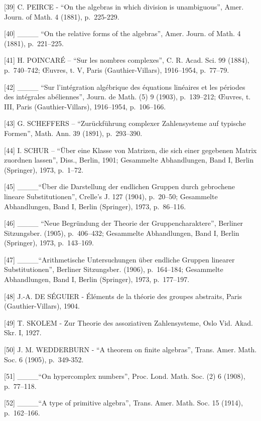 {[}39{]} C. PEIRCE - ``On the algebras in which division is unambiguous'', Amer. Journ. of Math. 4 (1881), p.~225-229.

{[}40{]} \_\_\_\_ ``On the relative forms of the algebras'', Amer. Journ. of Math. 4 (1881), p.~221--225.

{[}41{]} H. POINCARÉ -- ``Sur les nombres complexes'', C. R. Acad. Sci. 99 (1884), p.~740--742; Œuvres, t. V, Paris (Gauthier-Villars), 1916--1954, p.~77--79.

{[}42{]} \_\_\_\_ ``Sur l'intégration algébrique des équations linéaires et les périodes des intégrales abéliennes'', Journ. de Math. (5) 9 (1903), p.~139--212; Œuvres, t. III, Paris (Gauthier-Villars), 1916--1954, p.~106--166.

{[}43{]} G. SCHEFFERS -- ``Zurückführung complexer Zahlensysteme auf typische Formen'', Math. Ann. 39 (1891), p.~293--390.

{[}44{]} I. SCHUR -- ``Über eine Klasse von Matrizen, die sich einer gegebenen Matrix zuordnen lassen'', Diss., Berlin, 1901; Gesammelte Abhandlungen, Band I, Berlin (Springer), 1973, p.~1--72.

{[}45{]} \_\_\_\_``Über die Darstellung der endlichen Gruppen durch gebrochene lineare Substitutionen'', Crelle's J. 127 (1904), p.~20--50; Gesammelte Abhandlungen, Band I, Berlin (Springer), 1973, p.~86--116.

{[}46{]} \_\_\_\_ ``Neue Begründung der Theorie der Gruppencharaktere'', Berliner Sitzungsber. (1905), p.~406--432; Gesammelte Abhandlungen, Band I, Berlin (Springer), 1973, p.~143--169.

{[}47{]} \_\_\_\_``Arithmetische Untersuchungen über endliche Gruppen linearer Substitutionen'', Berliner Sitzungsber. (1906), p.~164--184; Gesammelte Abhandlungen, Band I, Berlin (Springer), 1973, p.~177--197.

{[}48{]} J.-A. DE SÉGUIER - Éléments de la théorie des groupes abstraits, Paris (Gauthier-Villars), 1904.

{[}49{]} T. SKOLEM - Zur Theorie des assoziativen Zahlensysteme, Oslo Vid. Akad. Skr. I, 1927.

{[}50{]} J. M. WEDDERBURN - ``A theorem on finite algebras'', Trans. Amer. Math. Soc. 6 (1905), p.~349-352.

{[}51{]} \_\_\_\_``On hypercomplex numbers'', Proc. Lond. Math. Soc. (2) 6 (1908), p.~77--118.

{[}52{]} \_\_\_\_``A type of primitive algebra'', Trans. Amer. Math. Soc. 15 (1914), p.~162--166.


